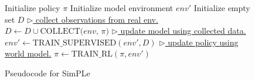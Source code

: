 \begin{figure}  %
\removelatexerror
\begin{algorithm}[H]
\caption{Pseudocode for SimPLe}\label{dpll}
\begin{algorithmic}
\STATE Initialize policy $\pi$
\STATE Initialize model environment $env'$
\STATE Initialize empty set ${D}$
\STATE \underline{$\triangleright$ collect observations from real env.}
\STATE $D \gets D \cup \text{COLLECT($env$, $\pi$)}$
\STATE \underline{$\triangleright$ update model using collected data.}
\STATE $env' \gets \text{TRAIN\_SUPERVISED}(env', {D})$
\STATE \underline{$\triangleright$ update policy using world model.}
\STATE $\pi \gets \text{TRAIN\_RL}(\pi, env')$
\ENDWHILE
\end{algorithmic}
\label{basic_loop}
\label{alg:basic_loop}
\end{algorithm}
\vspace{-0.8cm}
\end{figure}